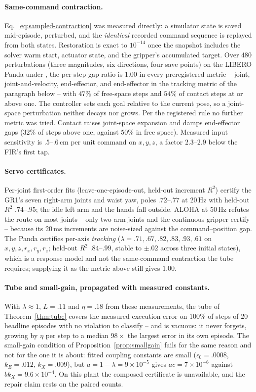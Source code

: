\paragraph{Same-command contraction.}
Eq.~\eqref{eq:sampled-contraction} was measured directly: a simulator state
is saved mid-episode, perturbed, and the \emph{identical} recorded command
sequence is replayed from both states. Restoration is exact to $10^{-14}$
once the snapshot includes the solver warm start, actuator state, and the
gripper's accumulated target. Over 480 perturbations (three magnitudes, six
directions, four save points) on the LIBERO Panda under ,
the per-step gap ratio is $1.00$ in every preregistered metric -- joint,
joint-and-velocity, end-effector, and end-effector in the tracking metric of
the paragraph below -- with $47\%$ of free-space steps and $54\%$ of contact
steps at or above one. The controller sets each goal relative to the current
pose, so a joint-space perturbation neither decays nor grows. Per the
registered rule no further metric was tried. Contact raises joint-space
expansion and damps end-effector gaps ($32\%$ of steps above one, against
$50\%$ in free space). Measured input sensitivity is $.5$--$.6$\,cm per unit
command on $x,y,z$, a factor $2.3$--$2.9$ below the FIR's first tap.

\paragraph{Servo certificates.}
Per-joint first-order fits (leave-one-episode-out, held-out increment $R^2$)
certify the GR1's seven right-arm joints and waist yaw, poles $.72$--$.77$ at
20\,Hz with held-out $R^2$ $.74$--$.95$; the idle left arm and the hands fall
outside. ALOHA at 50\,Hz refutes the route on most joints -- only two arm
joints and the continuous gripper certify -- because its $20$\,ms increments
are noise-sized against the command--position gap. The Panda certifies
per-axis \emph{tracking} ($\lambda=.71,.67,.82,.83,.93,.61$ on
$x,y,z,r_x,r_y,r_z$; held-out $R^2$ $.84$--$.99$, stable to $\pm.02$ across
three initial states), which is a response model and not the same-command
contraction the tube requires; supplying it as the metric above still gives
$1.00$.

\paragraph{Tube and small-gain, propagated with measured constants.}
With $\lambda\approx1$, $L=.11$ and $\eta=.18$ from these measurements, the
tube of Theorem~\ref{thm:tube} covers the measured execution error on
$100\%$ of steps of 20 headline episodes with no violation to classify --
and is vacuous: it never forgets, growing by $\eta$ per step to a median
$98\times$ the largest error in its own episode. The small-gain condition of
Proposition~\ref{prop:smallgain} fails for the same reason and not for the
one it is about: fitted coupling constants are small ($\epsilon_0=.0008$,
$k_E=.012$, $k_X=.009$), but $a=1-\lambda=9\times10^{-5}$ gives
$ac=7\times10^{-6}$ against $bk_X=9.6\times10^{-4}$. On this plant the
composed certificate is unavailable, and the repair claim rests on the
paired counts.


